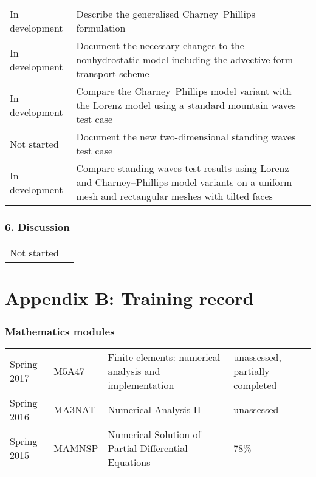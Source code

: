 \documentclass[a4paper,11pt]{article}
\begin{document}
\begin{tabularx}{\linewidth}{>{\hsize=1.3in}X X}
	In development & Describe the generalised Charney--Phillips formulation \\
	In development & Document the necessary changes to the nonhydrostatic model including the advective-form transport scheme \\
	In development & Compare the Charney--Phillips model variant with the Lorenz model using a standard mountain waves test case \citep{schaer2002} \\
	Not started & Document the new two-dimensional standing waves test case \\
	In development & Compare standing waves test results using Lorenz and Charney--Phillips model variants on a uniform mesh and rectangular meshes with tilted faces
\end{tabularx}

\subsubsection*{6. Discussion}
\vspace*{0.5em}

\begin{tabularx}{\linewidth}{>{\hsize=0.9in}X X}
Not started & 
\end{tabularx}


\newpage

\section*{Appendix B: Training record}

\subsubsection*{Mathematics modules}
\begin{tabular}{l l l l}
Spring 2017	& \href{https://finite-element.github.io}{M5A47}  & Finite elements: numerical analysis and implementation & unassessed, partially completed \\
Spring 2016	& \href{www.reading.ac.uk/module/document.aspx?modP=MA3NAT&modYR=1516}{MA3NAT} & Numerical Analysis II & unassessed \\
Spring 2015	& \href{www.reading.ac.uk/modules/document.aspx?modP=MAMNSP&modYR=1415}{MAMNSP} & Numerical Solution of Partial Differential Equations  & 78\% \\
\end{tabular}
\end{document}
